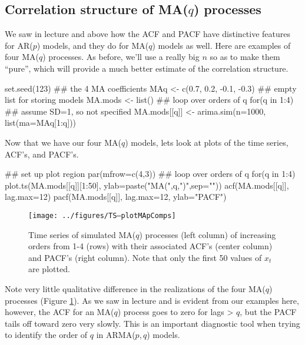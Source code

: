 \subsection{Correlation structure of MA($q$) processes}

We saw in lecture and above how the ACF and PACF have distinctive features for AR($p$) models, and they do for MA($q$) models as well.  Here are examples of four MA($q$) processes.  As before, we'll use a really big $n$ so as to make them ``pure'', which will provide a much better estimate of the correlation structure.

\begin{Schunk}
\begin{Sinput}
 set.seed(123)
 ## the 4 MA coefficients
 MAq <- c(0.7, 0.2, -0.1, -0.3)
 ## empty list for storing models
 MA.mods <- list()
 ## loop over orders of q
 for(q in 1:4) {
   ## assume SD=1, so not specified
   MA.mods[[q]] <- arima.sim(n=1000, list(ma=MAq[1:q]))
 }
\end{Sinput}
\end{Schunk}

Now that we have our four MA($q$) models, lets look at plots of the time series, ACF's, and PACF's.

\begin{Schunk}
\begin{Sinput}
 ## set up plot region
 par(mfrow=c(4,3))
 ## loop over orders of q
 for(q in 1:4) {
   plot.ts(MA.mods[[q]][1:50],
           ylab=paste("MA(",q,")",sep=""))
   acf(MA.mods[[q]], lag.max=12)
   pacf(MA.mods[[q]], lag.max=12, ylab="PACF")
 }
\end{Sinput}
\end{Schunk}

\begin{figure}[htp]
\begin{center}
\texttt{[image: ../figures/TS--plotMApComps]}
\end{center}
\caption{Time series of simulated MA($q$) processes (left column) of increasing orders from 1-4 (rows) with their associated ACF's (center column) and PACF's (right column).  Note that only the first 50 values of $x_t$ are plotted.}
\label{fig:LW1.MAqComps}
\end{figure}

\noindent Note very little qualitative difference in the realizations of the four MA($q$) processes (Figure \ref{fig:LW1.MAqComps}).  As we saw in lecture and is evident from our examples here, however, the ACF for an MA($q$) process goes to zero for lags > $q$, but the PACF tails off toward zero very slowly.  This is an important diagnostic tool when trying to identify the order of $q$ in ARMA($p,q$) models.



